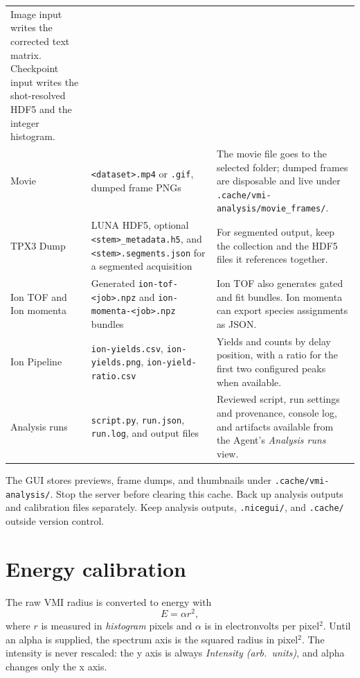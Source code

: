 \documentclass[11pt,a4paper]{article}
\newcommand{\code}[1]{\texttt{#1}}
\begin{document}
\begin{center}
\begin{longtable}{@{}L{2.6cm}L{6.4cm}L{6.2cm}@{}}
Image input writes the corrected text matrix. Checkpoint input writes the
shot-resolved HDF5 and the integer histogram. \\
\addlinespace
Movie & \code{<dataset>.\allowbreak{}mp4} or \code{.\allowbreak{}gif}, dumped frame PNGs &
The movie file goes to the selected folder; dumped frames are disposable
and live under \code{.\allowbreak{}cache/\allowbreak{}vmi-\allowbreak{}analysis/\allowbreak{}movie\_\allowbreak{}frames/\allowbreak{}}. \\
\addlinespace
TPX3 Dump & LUNA HDF5, optional \code{<stem>\_metadata.h5}, and
\code{<stem>.segments.json} for a segmented acquisition & For segmented
output, keep the collection and the HDF5 files it references together. \\
\addlinespace
Ion TOF and Ion momenta & Generated \code{ion-tof-<job>.npz} and
\code{ion-momenta-<job>.npz} bundles & Ion TOF also generates gated and fit
bundles. Ion momenta can export species assignments as JSON. \\
\addlinespace
Ion Pipeline & \code{ion-yields.csv}, \code{ion-yields.png},
\code{ion-yield-ratio.csv} & Yields and counts by delay position, with a ratio
for the first two configured peaks when available. \\
\addlinespace
Analysis runs & \code{script.py}, \code{run.json}, \code{run.log}, and output files
& Reviewed script, run settings and provenance, console log, and artifacts
available from the Agent's \emph{Analysis runs} view. \\
\end{longtable}
\end{center}

The GUI stores previews, frame dumps, and thumbnails under
\code{.\allowbreak{}cache/\allowbreak{}vmi-\allowbreak{}analysis/\allowbreak{}}.
Stop the server before clearing this cache. Back up analysis outputs and
calibration files separately. Keep analysis outputs, \code{.nicegui/\allowbreak{}},
and \code{.\allowbreak{}cache/\allowbreak{}} outside version control.

\section{Energy calibration}
\label{sec:calibration}

The raw VMI radius is converted to energy with
\begin{equation}
  E = \alpha r^2 ,
\end{equation}
where $r$ is measured in \emph{histogram} pixels and $\alpha$ is in
electronvolts per pixel$^2$. Until an alpha is supplied, the spectrum axis is
the squared radius in pixel$^2$. The intensity is never rescaled: the y axis
is always \emph{Intensity (arb.\ units)}, and alpha changes only the x axis.
\end{document}
